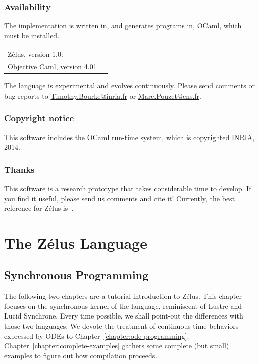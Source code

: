 \documentclass[11pt,titlepage,twoside]{report}
\newcommand{\zelus}{{\sf Z\'elus}}
\newcommand{\lustre}{{\sf Lustre}}
\newcommand{\lucy}{{\sf Lucid Synchrone}}
\newcommand{\ocaml}{{\sf OCaml}}
\begin{document}
\section*{Availability}
The implementation is written in, and generates programs in, \ocaml, which 
must be installed.
\begin{center}
\begin{tabular}{ll}
\zelus, version 1.0:  & 
  \ahrefurl{\url{http://zelus.di.ens.fr}} \\
Objective Caml, version 4.01  & 
  \ahrefurl{\url{http://www.ocaml.org}}
\end{tabular}
\end{center}
The language is experimental and evolves continuously. Please send
comments or bug reports to \url{Timothy.Bourke@inria.fr} or 
\url{Marc.Pouzet@ens.fr}. 

\section*{Copyright notice}
This software includes the \ocaml{} run-time system, which is
copyrighted INRIA, 2014. 

\section*{Thanks}
This software is a research prototype that takes considerable time to 
develop. If
you find it useful, please send us comments and cite it!
Currently, the best reference for \zelus{} is~\cite{lucy:hscc13}.

\cleardoublepage
\part{The Z\'elus Language}
\cleardoublepage

\chapter{Synchronous Programming}
\label{chapter:synchronous-programming}
The following two chapters are a tutorial introduction to \zelus. This
chapter focuses on the synchronous kernel of the language, reminiscent
of \lustre{} and \lucy. Every time possible, we shall point-out the
differences with those two languages. We devote the treatment of
continuous-time behaviors expressed by \acp{ODE} to
Chapter~\ref{chapter:ode-programming}. Chapter~\ref{chapter:complete-examples}
gathers some complete (but small) examples to figure out how
compilation proceeds.
\end{document}
